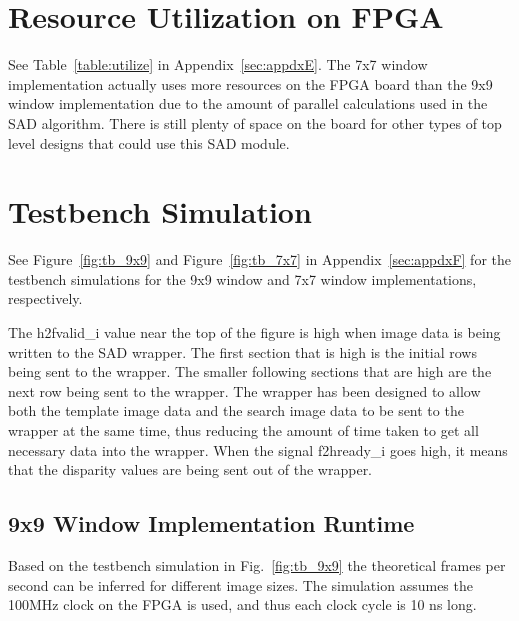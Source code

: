 \section{Resource Utilization on FPGA}
\label{sec:utilize}

See Table~\ref{table:utilize} in Appendix~\ref{sec:appdxE}. The 7x7 window implementation actually uses more resources on the FPGA board than the 9x9 window implementation due to the amount of parallel calculations used in the SAD algorithm. There is still plenty of space on the board for other types of top level designs that could use this SAD module.


\section{Testbench Simulation}
\label{sec:testbench}

See Figure~\ref{fig:tb_9x9} and Figure~\ref{fig:tb_7x7} in Appendix~\ref{sec:appdxF} for the testbench simulations for the 9x9 window and 7x7 window implementations, respectively.

The h2fvalid\_i value near the top of the figure is high when image data is being written to the SAD wrapper. The first section that is high is the initial rows being sent to the wrapper. The smaller following sections that are high are the next row being sent to the wrapper. The wrapper has been designed to allow both the template image data and the search image data to be sent to the wrapper at the same time, thus reducing the amount of time taken to get all necessary data into the wrapper. When the signal f2hready\_i goes high, it means that the disparity values are being sent out of the wrapper. 

\subsection{9x9 Window Implementation Runtime}
\label{sec:testbench9x9}

Based on the testbench simulation in Fig.~\ref{fig:tb_9x9} the theoretical frames per second can be inferred for different image sizes. The simulation assumes the 100MHz clock on the FPGA is used, and thus each clock cycle is 10 ns long.

